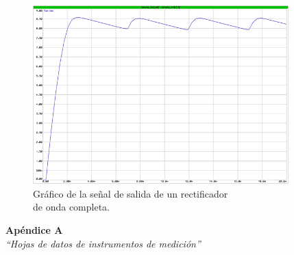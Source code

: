 \documentclass{article}
\begin{document}
\begin{figure}[h]
	\centering
	\includegraphics[width=0.88\textwidth]{images/4-4-9-grafico-circuito-rectificador-onda-completa-con-filtro-alt.jpg}
	\medskip
	\caption{Gráfico de la señal de salida de un rectificador\\ de onda completa.}
\end{figure}
\bigskip\bigskip






\newpage \textit{}
\newpage



\newpage
\vspace*{4cm}
\begin{center}
	\textbf{\Huge{Apéndice A}} \\
	\bigskip\bigskip
	\Large{\textit{``Hojas de datos de instrumentos de medición''}}
\end{center}


\newpage \textit{}
\newpage
\end{document}
